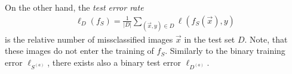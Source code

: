 On the other hand, the \textit{test error rate}
\begin{align}\label{eq:test_error}
	\ell_{D}(f_S) = \frac{1}{|D|} \sum_{(\vec{x}, y) \in D} \ell(f_S(\vec{x}), y)
\end{align}
is the relative number of missclassified images $\vec{x}$ in the test set $D$. Note, that these images do not enter the training of $f_S$. Similarly to the binary training error $\ell_{S^{(a)}}$, there exists also a binary test error $\ell_{D^{(a)}}$.